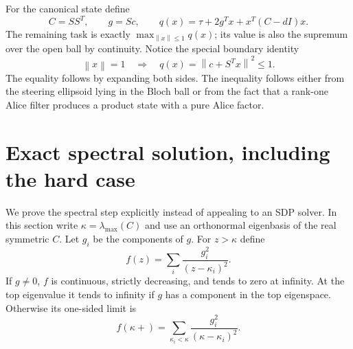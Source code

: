\documentclass[11pt]{article}
\theoremstyle{remark}\newtheorem{remark}[theorem]{Remark}
\newcommand{\norm}[1]{\left\lVert#1\right\rVert}
\begin{document}
For the canonical state define
\begin{equation}\label{eq:canonicalq}
 C=SS^T,\qquad g=Sc,\qquad
 q(x)=\tau+2g^Tx+x^T(C-dI)x.
\end{equation}
The remaining task is exactly $\max_{\norm x\leq1}q(x)$; its value is also
the supremum over the open ball by continuity. Notice the special boundary
identity
\begin{equation}\label{eq:boundary}
 \norm x=1\quad\Longrightarrow\quad q(x)=\norm{c+S^Tx}^2\leq1.
\end{equation}
The equality follows by expanding both sides. The inequality follows either
from the steering ellipsoid lying in the Bloch ball or from the fact that a
rank-one Alice filter produces a product state with a pure Alice factor.

\section{Exact spectral solution, including the hard case}

We prove the spectral step explicitly instead of appealing to an SDP solver.
In this section write $\kappa=\lambda_{\max}(C)$ and use an orthonormal
eigenbasis of the real symmetric $C$. Let $g_i$ be the components of $g$.
For $z>\kappa$ define
\begin{equation}\label{eq:secular}
 f(z)=\sum_i\frac{g_i^2}{(z-\kappa_i)^2}.
\end{equation}
If $g\ne0$, $f$ is continuous, strictly decreasing, and tends to zero at
infinity. At the top eigenvalue it tends to infinity if $g$ has a component in
the top eigenspace. Otherwise its one-sided limit is
\[
 f(\kappa+)=\sum_{\kappa_i<\kappa}
 \frac{g_i^2}{(\kappa-\kappa_i)^2}.
\]
\end{document}
